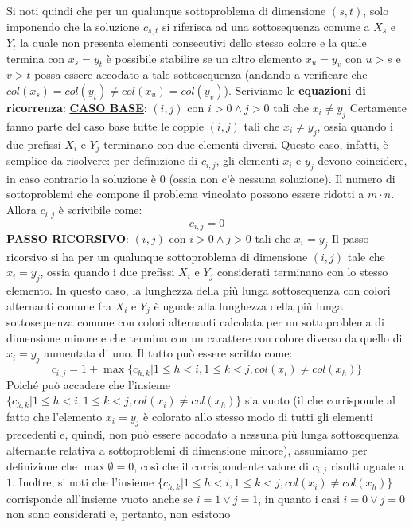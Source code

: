 \documentclass[12pt]{article}
\begin{document}
Si noti quindi che per un qualunque sottoproblema di dimensione $(s,t)$, solo imponendo che la soluzione $c_{s,t}$ si riferisca ad una sottosequenza comune a $X_s$ e $Y_t$ la quale non presenta elementi consecutivi dello stesso colore e la quale termina con $x_s = y_t$ è possibile stabilire se un altro elemento $x_u = y_v$ con $u >s$ e $v>t$ possa essere accodato a tale sottosequenza (andando a verificare che 
$col(x_s) = col(y_t) \neq col(x_u) = col(y_v)$).
Scriviamo le \textbf{equazioni di ricorrenza}: \newline
\textbf{\underline{CASO BASE}}: $(i,j)$ con $i > 0 \land j > 0$ tali che $x_i \neq y_j$ \newline
Certamente fanno parte del caso base tutte le coppie $(i,j)$ tali che $x_i \neq y_j$, ossia quando i due prefissi $X_i$ e $Y_j$ terminano con due elementi diversi.
Questo caso, infatti, è semplice da risolvere: per definizione di $c_{i,j}$, gli elementi $x_i$ e $y_j$ devono coincidere, in caso contrario la soluzione è $0$ (ossia non c'è nessuna soluzione).
Il numero di sottoproblemi che compone il problema vincolato possono essere ridotti a $m \cdot n$. Allora $c_{i,j}$ è scrivibile come:
$$c_{i,j} = 0$$
\textbf{\underline{PASSO RICORSIVO}}: $(i,j)$ con $i > 0 \land j > 0$ tali che $x_i = y_j$ \newline
Il passo ricorsivo si ha per un qualunque sottoproblema di dimensione $(i,j)$ tale che $x_i = y_j$, ossia quando i due prefissi $X_i$ e $Y_j$ considerati terminano con lo stesso elemento.
In questo caso, la lunghezza della più lunga sottosequenza con colori alternanti comune fra $X_i$ e $Y_j$ è uguale alla lunghezza della più lunga sottosequenza comune con colori alternanti calcolata per un sottoproblema di dimensione minore e che termina con un carattere con colore diverso da quello di $x_i = y_j$ aumentata di uno.
Il tutto può essere scritto come:
$$c_{i,j} = 1 + \max\{c_{h,k}|1 \leq h < i, 1 \leq k < j, col(x_i) \neq col(x_h)\}$$
Poiché può accadere che l'insieme $\{c_{h,k}|1 \leq h < i, 1 \leq k < j, col(x_i) \neq col(x_h)\}$ sia vuoto (il che corrisponde al fatto che l'elemento $x_i = y_j$ è colorato allo stesso modo di tutti gli elementi precedenti e, quindi, non può essere accodato a nessuna più lunga sottosequenza alternante relativa a sottoproblemi di dimensione minore),
assumiamo per definizione che $\max \emptyset = 0$, così che il corrispondente valore di $c_{i,j}$ risulti uguale a $1$. Inoltre, si noti che l'insieme $\{c_{h,k}|1 \leq h < i, 1 \leq k < j, col(x_i) \neq col(x_h)\}$ corrisponde all'insieme vuoto anche se $i = 1 \vee j = 1$, in quanto i casi $i = 0 \vee j = 0$ non sono considerati e, pertanto, non esistono
\end{document}
